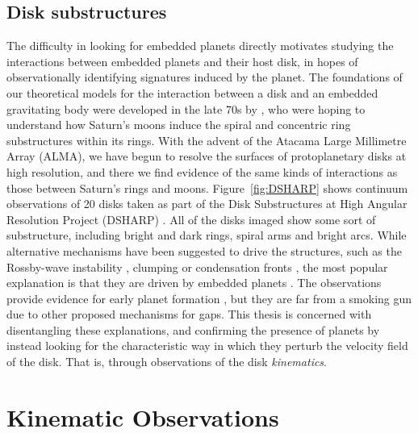 \subsection{Disk substructures}

The difficulty in looking for embedded planets directly motivates studying the interactions between embedded planets and their host disk, in hopes of observationally identifying signatures induced by the planet.
The foundations of our theoretical models for the interaction between a disk and an embedded gravitating body were developed in the late 70s by \citet{goldreich1978,goldreich1979,goldreich1980}, who were hoping to understand how Saturn's moons induce the spiral and concentric ring substructures within its rings.
With the advent of the Atacama Large Millimetre Array (ALMA), we have begun to resolve the surfaces of protoplanetary disks at high resolution, and there we find evidence of the same kinds of interactions as those between Saturn's rings and moons.
Figure~\ref{fig:DSHARP} shows continuum observations of 20 disks taken as part of the Disk Substructures at High Angular Resolution Project (DSHARP) \citep{andrews2018}.
All of the disks imaged show some sort of substructure, including bright and dark rings, spiral arms and bright arcs.
While alternative mechanisms have been suggested to drive the structures, such as the Rossby-wave instability \citep{pinilla2012}, clumping \citep{lyra2013} or condensation fronts \citep{zhang2015a}, the most popular explanation is that they are driven by embedded planets \citep{dipierro2015,dong2015b,bae2017,fedele2017,fedele2018,zhang2018}.
The observations provide evidence for early planet formation \citep[e.g. fully formed planets in HL Tau with age $<1$ Myr, see][]{dipierro2015}, but they are far from a smoking gun due to other proposed mechanisms for gaps.
This thesis is concerned with disentangling these explanations, and confirming the presence of planets by instead looking for the characteristic way in which they perturb the velocity field of the disk.
That is, through observations of the disk \textit{kinematics}.

\section{Kinematic Observations}

